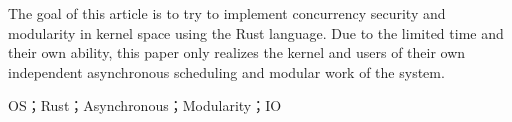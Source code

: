 The goal of this article is to try to implement concurrency security and modularity in kernel space using the Rust language. Due to the limited time and their own ability, this paper only realizes the kernel and users of their own independent asynchronous scheduling and modular work of the system.

\keywordsen\quad OS；Rust；Asynchronous；Modularity；IO